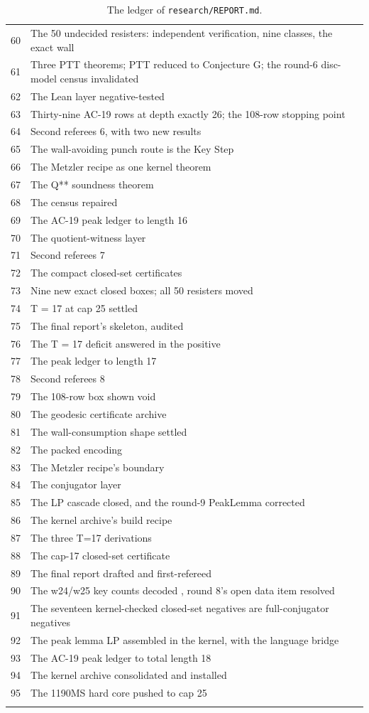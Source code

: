 \documentclass[11pt,a4paper]{article}
\theoremstyle{definition}
\begin{document}
\begin{longtable}{rp{}}
60 & The 50 undecided resisters: independent verification, nine classes, the exact wall \\
61 & Three PTT theorems; PTT reduced to Conjecture G; the round-6 disc-model census invalidated \\
62 & The Lean layer negative-tested \\
63 & Thirty-nine AC-19 rows at depth exactly 26; the 108-row stopping point \\
64 & Second referees 6, with two new results \\
65 & The wall-avoiding punch route is the Key Step \\
66 & The Metzler recipe as one kernel theorem \\
67 & The Q** soundness theorem \\
68 & The census repaired \\
69 & The AC-19 peak ledger to length 16 \\
70 & The quotient-witness layer \\
71 & Second referees 7 \\
72 & The compact closed-set certificates \\
73 & Nine new exact closed boxes; all 50 resisters moved \\
74 & T = 17 at cap 25 settled \\
75 & The final report's skeleton, audited \\
76 & The T = 17 deficit answered in the positive \\
77 & The peak ledger to length 17 \\
78 & Second referees 8 \\
79 & The 108-row box shown void \\
80 & The geodesic certificate archive \\
81 & The wall-consumption shape settled \\
82 & The packed encoding \\
83 & The Metzler recipe's boundary \\
84 & The conjugator layer \\
85 & The LP cascade closed, and the round-9 PeakLemma corrected \\
86 & The kernel archive's build recipe \\
87 & The three T=17 derivations \\
88 & The cap-17 closed-set certificate \\
89 & The final report drafted and first-refereed \\
90 & The w24/w25 key counts decoded , round 8's open data item resolved \\
91 & The seventeen kernel-checked closed-set negatives are full-conjugator negatives \\
92 & The peak lemma LP assembled in the kernel, with the language bridge \\
93 & The AC-19 peak ledger to total length 18 \\
94 & The kernel archive consolidated and installed \\
95 & The 1190MS hard core pushed to cap 25 \\
\bottomrule
\caption{The ledger of \texttt{research/REPORT.md}.}
\label{tab:ledger}
\end{longtable}
\end{document}
